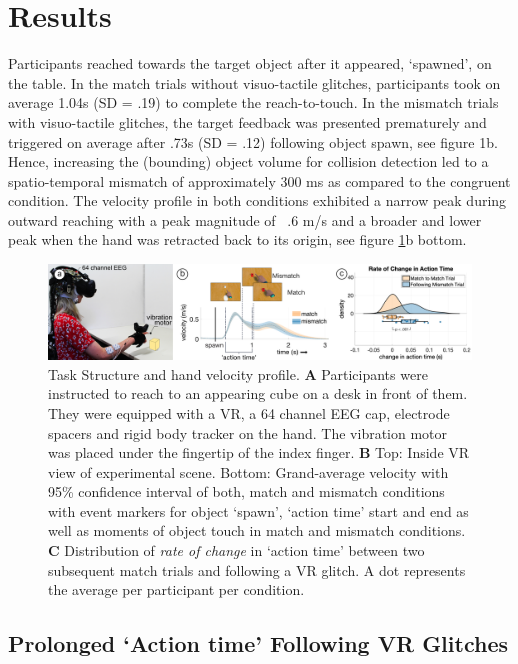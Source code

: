 
\section{Results}

Participants reached towards the target object after it appeared, `spawned', on the table. In the match trials without visuo-tactile glitches, participants took on average 1.04s (SD = .19) to complete the reach-to-touch. In the mismatch trials with visuo-tactile glitches, the target feedback was presented prematurely and triggered on average after .73s (SD = .12) following object spawn, see figure 1b. Hence, increasing the (bounding) object volume for collision detection led to a spatio-temporal mismatch of approximately 300 ms as compared to the congruent condition. The velocity profile in both conditions exhibited a narrow peak during outward reaching with a peak magnitude of ~.6 m/s and a broader and lower peak when the hand was retracted back to its origin, see figure \ref{setup_and_behavior}b bottom.

\begin{figure}[!h]
  \includegraphics[width=\textwidth]{figures/task_behavior.jpg}
  \caption{Task Structure and hand velocity profile. \textbf{A} Participants were instructed to reach to an appearing cube on a desk in front of them. They were equipped with a VR, a 64 channel EEG cap, electrode spacers and rigid body tracker on the hand. The vibration motor was placed under the fingertip of the index finger. \textbf{B} Top: Inside VR view of experimental scene. Bottom: Grand-average velocity with 95\% confidence interval of both, match and mismatch conditions with event markers for object `spawn', `action time' start and end as well as moments of object touch in match and mismatch conditions. \textbf{C} Distribution of \textit{rate of change} in `action time' between two subsequent match trials and following a VR glitch. A dot represents the average per participant per condition.}
  \label{setup_and_behavior}
\end{figure}

\subsection{Prolonged `Action time' Following VR Glitches}

